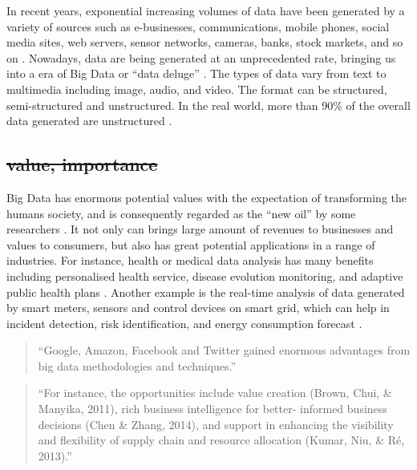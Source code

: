 \documentclass[conference]{IEEEtran}
\begin{document}
In recent years, exponential increasing volumes of data have been
generated by a variety of sources such as e-businesses, communications,
mobile phones, social media sites, web servers, sensor networks,
cameras, banks, stock markets, and so on
\autocite{OUSSOUS2018431,SIVARAJAH2017}. Nowadays, data are being
generated at an unprecedented rate, bringing us into a era of Big Data
or ``data deluge'' \autocite{SIVARAJAH2017,hu2014}. The types of data
vary from text to multimedia including image, audio, and video. The
format can be structured, semi-structured and unstructured. In the real
world, more than 90\% of the overall data generated are unstructured
\autocite{SIVARAJAH2017}.

\hypertarget{value-importance}{%
\subsection{\texorpdfstring{\sout{value,
importance}}{value, importance}}\label{value-importance}}

Big Data has enormous potential values with the expectation of
transforming the humans society, and is consequently regarded as the
``new oil'' by some researchers \autocite{hu2014}. It not only can
brings large amount of revenues to businesses and values to consumers,
but also has great potential applications in a range of industries. For
instance, health or medical data analysis has many benefits including
personalised health service, disease evolution monitoring, and adaptive
public health plans \autocite{OUSSOUS2018431}. Another example is the
real-time analysis of data generated by smart meters, sensors and
control devices on smart grid, which can help in incident detection,
risk identification, and energy consumption forecast
\autocite{OUSSOUS2018431}.

\begin{quote}
``Google, Amazon, Facebook and Twitter gained enormous advantages from
big data methodologies and techniques.'' \autocite{Hewage2018}
\end{quote}

\begin{quote}
``For instance, the opportunities include value creation (Brown, Chui,
\& Manyika, 2011), rich business intelligence for better- informed
business decisions (Chen \& Zhang, 2014), and support in enhancing the
visibility and flexibility of supply chain and resource allocation
(Kumar, Niu, \& Ré, 2013).'' \autocite{SIVARAJAH2017}
\end{quote}
\end{document}
